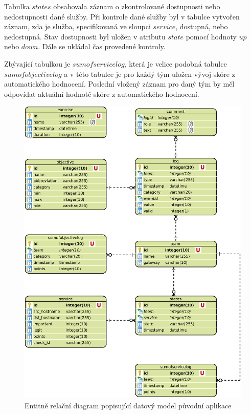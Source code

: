 \documentclass[
  digital, %
  twoside, %
  table,   %
  lof,     %
  lot,     %
]{fithesis3}
\begin{document}
Tabulka $states$ obsahovala záznam o zkontrolované dostupnosti nebo nedostupnosti dané služby. Při kontrole dané služby byl v tabulce vytvořen záznam, zda je služba, specifikovaná ve sloupci $service$, dostupná, nebo nedostupná. Stav dostupnosti byl uložen v atributu $state$ pomocí hodnoty $up$ nebo $down$. Dále se ukládal čas provedené kontroly.

Zbývající tabulkou je $sumofservicelog$, která je velice podobná tabulce $sumofobjectivelog$ a v této tabulce je pro každý tým uložen vývoj skóre z automatického hodnocení. Poslední vložený záznam pro daný tým by měl odpovídat aktuální hodnotě skóre z automatického hodnocení.

\begin{figure}[b]
    \centering
    \includegraphics[width=13.5cm]{images/ERD-old-app.eps}
    \caption{Entitně relační diagram popisující datový model původní aplikace}
    \label{fig:erdOldApp}
\end{figure}
\end{document}
